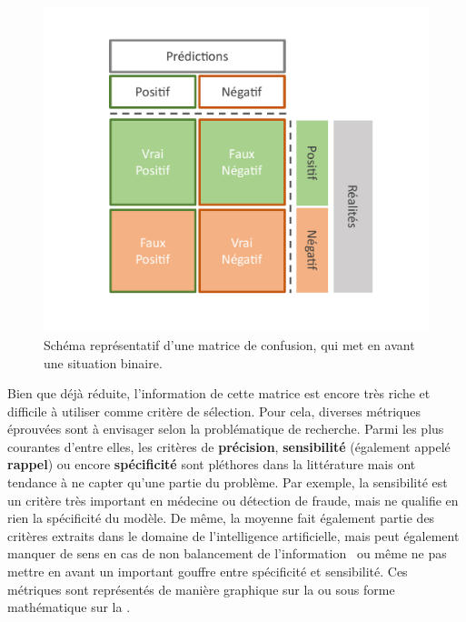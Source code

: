 \begin{figure}[H]
    \centering
    \includegraphics[width=\linewidth]{contents/chapter_3/resources/scheme_confusion_matrix.pdf}
    \caption{Schéma représentatif d’une matrice de confusion, qui met en avant une situation binaire.}
    \label{fig:scheme_confusion_matrix}
\end{figure}

Bien que déjà réduite, l'information de cette matrice est encore très riche et difficile à utiliser comme critère de sélection. Pour cela, diverses métriques éprouvées sont à envisager selon la problématique de recherche. Parmi les plus courantes d'entre elles, les critères de \textbf{précision}, \textbf{sensibilité} (également appelé \textbf{rappel}) ou encore \textbf{spécificité} sont pléthores dans la littérature mais ont tendance à ne capter qu'une partie du problème. Par exemple, la sensibilité est un critère très important en médecine ou détection de fraude, mais ne qualifie en rien la spécificité du modèle. De même, la moyenne fait également partie des critères extraits dans le domaine de l'intelligence artificielle, mais peut également manquer de sens en cas de non balancement de l'information~\cite{Guo2008} ou même ne pas mettre en avant un important gouffre entre spécificité et sensibilité. Ces métriques sont représentés de manière graphique sur la  ou sous forme mathématique sur la .\par

